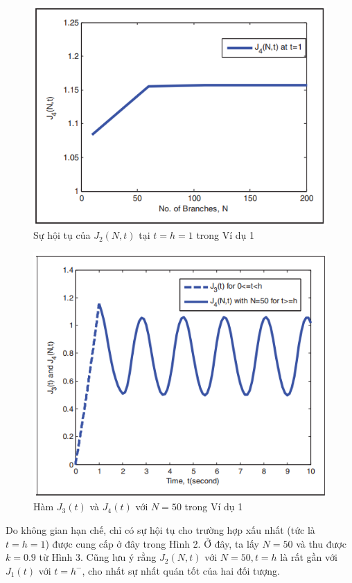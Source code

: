 \begin{vd}
\begin{figure}[h!]
	\includegraphics[scale= 0.7]{"./Hinh/Hinh14"}
	\caption[Sự hội tụ của $J_4(N,t)$ tại $t = h = 1$ trong Ví dụ 1]{Sự hội tụ của $J_2(N,t)$ tại $t = h = 1$ trong Ví dụ 1}
	\label{fig:hinh-14}
\end{figure}
\begin{figure}[h!]
	\centering
	\includegraphics[scale= 0.7]{"./Hinh/Hinh15"}
	\caption[Hàm $J_3(t)$ và $J_4(t)$ với $N = 50$ trong Ví dụ 1 ]{Hàm $J_3(t)$ và $J_4(t)$ với $N = 50$ trong Ví dụ 1}
	\label{fig:hinh-15}
\end{figure}
Do không gian hạn chế, chỉ có sự hội tụ cho trường hợp xấu nhất (tức là $ t = h = 1$) được cung cấp ở đây trong Hình 2. Ở đây, ta lấy $N = 50$ và thu được $k = 0.9$ từ Hình 3. Cũng lưu ý rằng $J_2(N,t)$ với $N = 50, t =h$ là rất gần với $J_1(t)$ với $ t = h^-$, cho nhất sự nhất quán tốt của hai đối tượng.\\

\end{vd}
